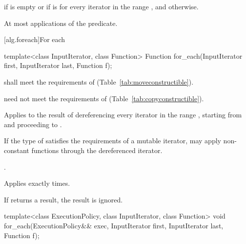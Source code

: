 \begin{itemdescr}
\pnum
\returns {} if
 is empty or if
 is  for every iterator  in the range , and  otherwise.

\pnum
\complexity At most  applications of the predicate.
\end{itemdescr}

[alg.foreach]{For each}

%
\begin{itemdecl}
template<class InputIterator, class Function>
  Function for_each(InputIterator first, InputIterator last, Function f);
\end{itemdecl}

\begin{itemdescr}
\pnum
\requires {} shall meet the requirements of
 (Table~\ref{tab:moveconstructible}).
\begin{note}  need not meet the requirements of
 (Table~\ref{tab:copyconstructible}). \end{note}

\pnum
\effects
Applies
 to the result of dereferencing every iterator in the range
,
starting from
and proceeding to
.
\begin{note} If the type of  satisfies the
requirements of a mutable iterator,  may apply non-constant
functions through the dereferenced iterator.\end{note}

\pnum
\returns
{}.

\pnum
\complexity
Applies 
exactly
times.

\pnum
\remarks
If  returns a result, the result is ignored.
\end{itemdescr}

%
\begin{itemdecl}
template<class ExecutionPolicy, class InputIterator, class Function>
  void for_each(ExecutionPolicy&& exec,
                InputIterator first, InputIterator last,
                Function f);
\end{itemdecl}

